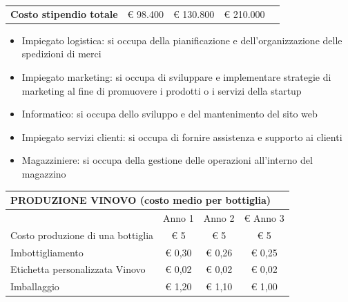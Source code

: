 \documentclass[12pt, a4paper]{article}
\begin{document}
\begin{longtable}{lcccc}
    \multicolumn{1}{|l|}{\multirow{-2}{*}{\cellcolor[HTML]{CBCEFB}\textbf{Costo stipendio totale}}}                       & \multicolumn{1}{c|}{€ 98.400}                                                                                              & \multicolumn{1}{c|}{€ 130.800}                                                                                             & \multicolumn{1}{c|}{€ 210.000}                                                                                             &                                                                                                                   \\ \cline{1-4}
\end{longtable}
\begin{itemize}
    \item Impiegato logistica: si occupa della pianificazione e dell'organizzazione delle spedizioni di merci
    \item Impiegato marketing: si occupa di sviluppare e implementare strategie di marketing al fine di promuovere i prodotti o i servizi della startup
    \item Informatico: si occupa dello sviluppo e del mantenimento del sito web
    \item Impiegato servizi clienti: si occupa di fornire assistenza e supporto ai clienti
    \item Magazziniere: si occupa della gestione delle operazioni all'interno del magazzino
\end{itemize}\newpage
\begin{longtable}{|lccc|}
    \hline
    \multicolumn{4}{|l|}{\cellcolor[HTML]{CBCEFB}\textbf{PRODUZIONE VINOVO (costo medio per bottiglia)}}                           \\ \hline
    \multicolumn{1}{|l|}{}                                  & \multicolumn{1}{c|}{Anno 1} & \multicolumn{1}{c|}{Anno 2} & € Anno 3 \\ \hline
    \multicolumn{1}{|l|}{Costo produzione di una bottiglia} & \multicolumn{1}{c|}{€ 5}    & \multicolumn{1}{c|}{€ 5}    & € 5      \\ \hline
    \multicolumn{1}{|l|}{Imbottigliamento}                  & \multicolumn{1}{c|}{€ 0,30} & \multicolumn{1}{c|}{€ 0,26} & € 0,25   \\ \hline
    \multicolumn{1}{|l|}{Etichetta personalizzata Vinovo}   & \multicolumn{1}{c|}{€ 0,02} & \multicolumn{1}{c|}{€ 0,02} & € 0,02   \\ \hline
    \multicolumn{1}{|l|}{Imballaggio}                       & \multicolumn{1}{c|}{€ 1,20} & \multicolumn{1}{c|}{€ 1,10} & € 1,00   \\\hline
\end{longtable}
\end{document}
